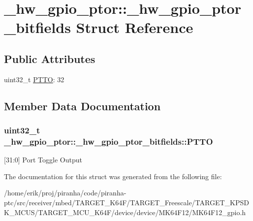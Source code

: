 \hypertarget{struct__hw__gpio__ptor_1_1__hw__gpio__ptor__bitfields}{}\section{\+\_\+hw\+\_\+gpio\+\_\+ptor\+:\+:\+\_\+hw\+\_\+gpio\+\_\+ptor\+\_\+bitfields Struct Reference}
\label{struct__hw__gpio__ptor_1_1__hw__gpio__ptor__bitfields}
\subsection*{Public Attributes}
\begin{DoxyCompactItemize}
\item 
uint32\+\_\+t \hyperlink{struct__hw__gpio__ptor_1_1__hw__gpio__ptor__bitfields_a3a75e2752bb8d7e6e4cc6ec3fc51b0bd}{P\+T\+TO}\+: 32
\end{DoxyCompactItemize}


\subsection{Member Data Documentation}
\subsubsection[{\texorpdfstring{P\+T\+TO}{PTTO}}]{\setlength{\rightskip}{0pt plus 5cm}uint32\+\_\+t \+\_\+hw\+\_\+gpio\+\_\+ptor\+::\+\_\+hw\+\_\+gpio\+\_\+ptor\+\_\+bitfields\+::\+P\+T\+TO}\hypertarget{struct__hw__gpio__ptor_1_1__hw__gpio__ptor__bitfields_a3a75e2752bb8d7e6e4cc6ec3fc51b0bd}{}\label{struct__hw__gpio__ptor_1_1__hw__gpio__ptor__bitfields_a3a75e2752bb8d7e6e4cc6ec3fc51b0bd}
\mbox{[}31\+:0\mbox{]} Port Toggle Output 

The documentation for this struct was generated from the following file\+:\begin{DoxyCompactItemize}
\item 
/home/erik/proj/piranha/code/piranha-\/ptc/src/receiver/mbed/\+T\+A\+R\+G\+E\+T\+\_\+\+K64\+F/\+T\+A\+R\+G\+E\+T\+\_\+\+Freescale/\+T\+A\+R\+G\+E\+T\+\_\+\+K\+P\+S\+D\+K\+\_\+\+M\+C\+U\+S/\+T\+A\+R\+G\+E\+T\+\_\+\+M\+C\+U\+\_\+\+K64\+F/device/device/\+M\+K64\+F12/M\+K64\+F12\+\_\+gpio.\+h\end{DoxyCompactItemize}
